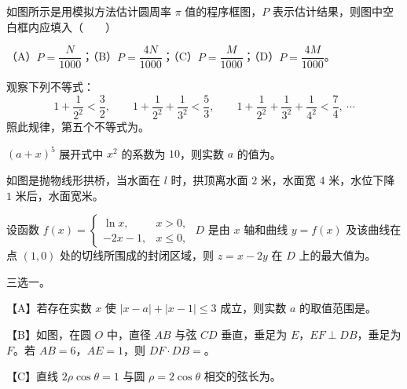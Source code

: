 \begingroup
\renewenvironment{question}{\Needspace{0.5\textheight}}{}
\begin{question}
如图所示是用模拟方法估计圆周率 $\pi$ 值的程序框图，$P$ 表示估计结果，则图中空白框内应填入\mbox{（　　）}
\nopagebreak[4]
\begin{center}\end{center}
\nopagebreak[4]
（A）$P=\dfrac N{1000}$；（B）$P=\dfrac{4N}{1000}$；（C）$P=\dfrac M{1000}$；（D）$P=\dfrac{4M}{1000}$。

\end{question}
\endgroup
{}

\begin{question}
观察下列不等式：
\nopagebreak[4]
\[1+\frac1{2^2}<\frac32,\qquad1+\frac1{2^2}+\frac1{3^2}<\frac53,\qquad1+\frac1{2^2}+\frac1{3^2}+\frac1{4^2}<\frac74,\ \cdots\]
照此规律，第五个不等式为\gkblank{}。

\end{question}
\begin{question}
$(a+x)^5$ 展开式中 $x^2$ 的系数为 $10$，则实数 $a$ 的值为\gkblank{}。

\Needspace{0.4\textheight}
\end{question}
\begin{question}
如图是抛物线形拱桥，当水面在 $l$ 时，拱顶离水面 $2$ 米，水面宽 $4$ 米，水位下降 $1$ 米后，水面宽\gkblank{}米。
\nopagebreak[4]
\begin{center}\end{center}
\nopagebreak[4]
\end{question}
\begin{question}
设函数 $f(x)=\begin{cases}\ln x,&x>0,\\-2x-1,&x\leqslant0,\end{cases}$ $D$ 是由 $x$ 轴和曲线 $y=f(x)$ 及该曲线在点 $(1,0)$ 处的切线所围成的封闭区域，则 $z=x-2y$ 在 $D$ 上的最大值为\gkblank{}。

\Needspace{0.4\textheight}
\end{question}
\begin{question}
三选一。

【A】若存在实数 $x$ 使 $|x-a|+|x-1|\leqslant3$ 成立，则实数 $a$ 的取值范围是\gkblank{}。

【B】如图，在圆 $O$ 中，直径 $AB$ 与弦 $CD$ 垂直，垂足为 $E$，$EF\perp DB$，垂足为 $F$。若 $AB=6$，$AE=1$，则 $DF\cdot DB=$\gkblank{}。
\nopagebreak[4]
\begin{center}\end{center}
\nopagebreak[4]
【C】直线 $2\rho\cos\theta=1$ 与圆 $\rho=2\cos\theta$ 相交的弦长为\gkblank{}。

\end{question}

